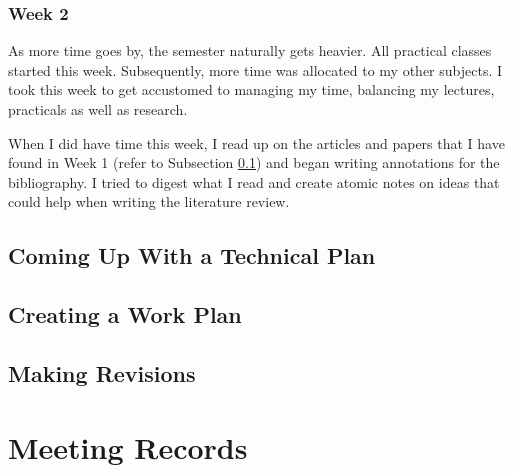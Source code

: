 \documentclass[a4paper, 12pt]{extreport}
\begin{document}
			\subsection{Week 2}\label{subsec:litrevw2}
				
				As more time goes by, the semester naturally gets heavier. All practical classes started this week. Subsequently, more time was allocated to my other subjects. I took this week to get accustomed to managing my time, balancing my lectures, practicals as well as research.
				
				When I did have time this week, I read up on the articles and papers that I have found in Week 1 (refer to Subsection \ref{subsec:litrevw2}) and began writing annotations for the bibliography. I tried to digest what I read and create atomic notes on ideas that could help when writing the literature review.
		
		\section{Coming Up With a Technical Plan}
		
		\section{Creating a Work Plan}
		
		\section{Making Revisions}
		
	\nocite{*}
	\printbibliography[heading={bibnumbered}, title={Bibliography}]
	
	\chapter{Meeting Records}
		
		
		
		
		
\end{document}
